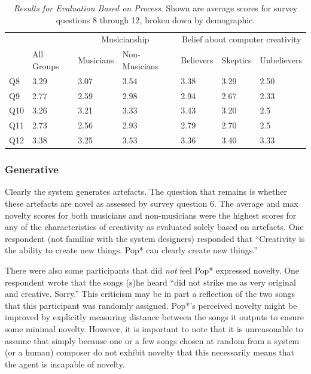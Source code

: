 \documentclass[phd,electronic,oneside,twosidetoc,letterpaper,chaptercenter,parttop,lof,lot]{byumsphd}
\begin{document}
\begin{table}[]
\centering
\begin{tabular}{@{}l|l|ll|lll|@{}}
                                        &            & \multicolumn{2}{c|}{Musicianship} & \multicolumn{3}{c|}{Belief about computer creativity} \\
                                        & All Groups & Musicians     & Non-Musicians    & Believers       & Skeptics       & Unbelievers       \\ \midrule
Q8         & 3.29       & 3.07          & 3.54             & 3.38            & 3.29           & 2.50              \\
Q9 & 2.77       & 2.59          & 2.98             & 2.94            & 2.67           & 2.33              \\
Q10                      & 3.26       & 3.21          & 3.33             & 3.43            & 3.20           & 2.5               \\
Q11           & 2.73       & 2.56          & 2.93             & 2.79            & 2.70           & 2.5               \\
Q12            & 3.38       & 3.25          & 3.53             & 3.36            & 3.40           & 3.33            \\
\end{tabular}
\caption{\label{tab:results2}\textit{Results for Evaluation Based on Process}. Shown are average scores for survey questions 8 through 12, broken down by demographic.}
\end{table}

\subsubsection{Generative}

Clearly the system generates artefacts. The question that remains is whether these artefacts are novel as assessed by survey question 6. The average and max novelty scores for both musicians and non-musicians were the highest scores for any of the characteristics of creativity as evaluated solely based on artefacts. One respondent (not familiar with the system designers) responded that ``Creativity is the ability to create new things. Pop* can clearly create new things.''

There were also some participants that did \textit{not} feel Pop* expressed novelty. One respondent wrote that the songs (s)he heard ``did not strike me as very original and creative. Sorry.'' This criticism may be in part a reflection of the two songs that this participant was randomly assigned. Pop*'s perceived novelty might be improved by explicitly measuring distance between the songs it outputs to ensure some minimal novelty. However, it is important to note that it is unreasonable to assume that simply because one or a few songs chosen at random from a system (or a human) composer do not exhibit novelty that this necessarily means that the agent is incapable of novelty.
\end{document}
